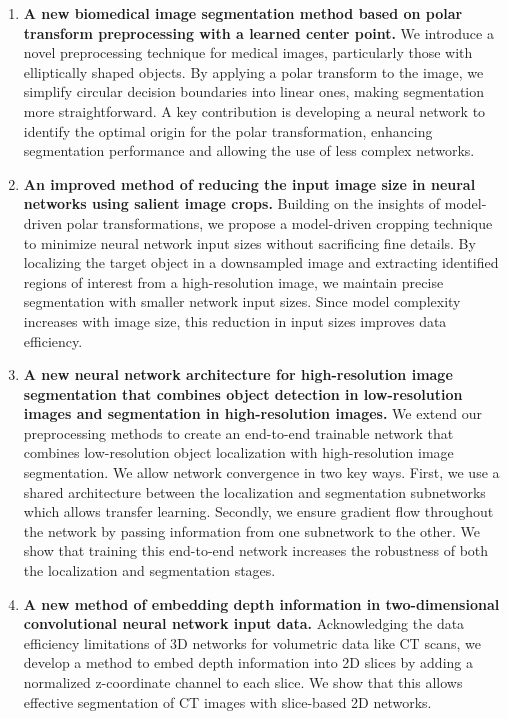 \begin{enumerate}
	\item \textbf{A new biomedical image segmentation method based on polar transform preprocessing with a learned center point.} We introduce a novel preprocessing technique for medical images, particularly those with elliptically shaped objects. By applying a polar transform to the image, we simplify circular decision boundaries into linear ones, making segmentation more straightforward. A key contribution is developing a neural network to identify the optimal origin for the polar transformation, enhancing segmentation performance and allowing the use of less complex networks.
	\item \textbf{An improved method of reducing the input image size in neural networks using salient image crops.} Building on the insights of model-driven polar transformations, we propose a model-driven cropping technique to minimize neural network input sizes without sacrificing fine details. By localizing the target object in a downsampled image and extracting identified regions of interest from a high-resolution image, we maintain precise segmentation with smaller network input sizes. Since model complexity increases with image size, this reduction in input sizes improves data efficiency.
	\item \textbf{A new neural network architecture for high-resolution image segmentation that combines object detection in low-resolution images and segmentation in high-resolution images.} We extend our preprocessing methods to create an end-to-end trainable network that combines low-resolution object localization with high-resolution image segmentation. We allow network convergence in two key ways. First, we use a shared architecture between the localization and segmentation subnetworks which allows transfer learning. Secondly, we ensure gradient flow throughout the network by passing information from one subnetwork to the other. We show that training this end-to-end network increases the robustness of both the localization and segmentation stages.
	\item \textbf{A new method of embedding depth information in two-dimensional convolutional neural network input data.} Acknowledging the data efficiency limitations of 3D networks for volumetric data like CT scans, we develop a method to embed depth information into 2D slices by adding a normalized z-coordinate channel to each slice. We show that this allows effective segmentation of CT images with slice-based 2D networks.
\end{enumerate}

